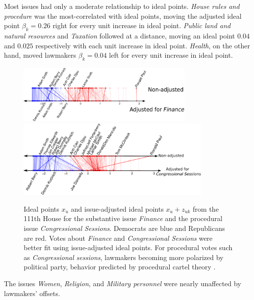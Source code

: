 Most issues had only a moderate relationship to ideal points.
\emph{House rules and procedure} was the most-correlated with ideal
points, moving the adjusted ideal point $\beta_k=0.26$ right for every
unit increase in ideal point. \emph{Public land and natural resources} and
\emph{Taxation} followed at a distance, moving an ideal point $0.04$
and $0.025$ respectively with each unit increase in ideal point.
\emph{Health}, on the other hand, moved lawmakers $\beta_k=0.04$ left
for every unit increase in ideal point.
\begin{figure}[t]
  \center
  \includegraphics[width=0.77\textwidth]{chapter_spatial_voting_with_text/figures/3393_example_ideal_points_finance.pdf}
  \vspace{-10pt}
  \includegraphics[width=0.85\textwidth]{chapter_spatial_voting_with_text/figures/3393_example_ideal_points_congressional_sessions.pdf}
  \caption{Ideal points $x_u$ and issue-adjusted ideal points $x_u +
    z_{uk}$ from the 111th House for the substantive issue
    \emph{Finance} and the procedural issue \emph{Congressional
      Sessions}. Democrats are blue and Republicans are red.  Votes
    about \emph{Finance} and \emph{Congressional Sessions} were better
    fit using issue-adjusted ideal points.  For procedural votes such
    as \emph{Congressional sessions}, lawmakers becoming more
    polarized by political party, behavior predicted by procedural
    cartel theory \citep{cox:1993}. }
  \label{fig:issue_improvements_ideals}
  \vspace{-5pt}
\end{figure}
The issues \emph{Women}, \emph{Religion}, and \emph{Military
personnel} were nearly unaffected by lawmakers' offsets.

